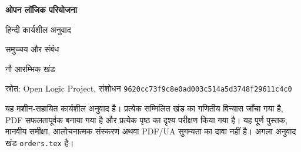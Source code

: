 \documentclass[../../../include/open-logic-section]{subfiles}
\begin{document}
\begingroup
\thispagestyle{empty}
\centering
\vspace*{0.13\textheight}
{\Huge\bfseries ओपन लॉजिक परियोजना\par}
\vspace{0.8cm}
{\LARGE हिन्दी कार्यशील अनुवाद\par}
\vspace{1.2cm}
{\Large समुच्चय और संबंध\par}
\vspace{0.4cm}
{\large नौ आरम्भिक खंड\par}
\vfill
{\normalsize स्रोत: Open Logic Project, संशोधन
\texttt{9620cc73f9c8e0ad003c514a5d3748f29611c4c0}\par}
\vspace{0.5cm}
{\small यह मशीन-सहायित कार्यशील अनुवाद है। प्रत्येक सम्मिलित खंड का
गणितीय विन्यास जाँचा गया है, PDF सफलतापूर्वक बनाया गया है और प्रत्येक
पृष्ठ का दृश्य परीक्षण किया गया है। यह पूर्ण पुस्तक, मानवीय समीक्षा,
आलोचनात्मक संस्करण अथवा PDF/UA सुगम्यता का दावा नहीं है। अगला अनुवाद
खंड \texttt{orders.tex} है।\par}
\vspace*{0.08\textheight}
\par
\endgroup
\clearpage
\raggedbottom

\tableofcontents*
\clearpage










\end{document}

